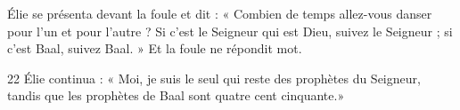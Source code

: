 Élie se présenta devant la foule et dit : « Combien de temps allez-vous danser pour l’un et pour l’autre ? Si c’est le Seigneur qui est Dieu, suivez le Seigneur ; si c’est Baal, suivez Baal. » Et la foule ne répondit mot.

22 Élie continua : « Moi, je suis le seul qui reste des prophètes du Seigneur, tandis que les prophètes de Baal sont quatre cent cinquante.»
